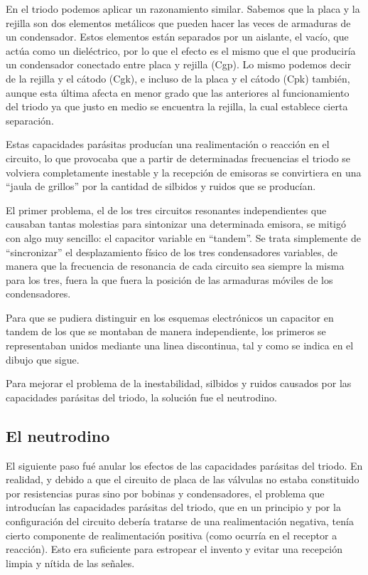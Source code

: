 \documentclass[letterpaper,11pt,spanish]{sphinxmanual}
\let\sphinxpxdimen\pdfpxdimen\else\newdimen\sphinxpxdimen
\begin{document}
En el triodo podemos aplicar un razonamiento similar. Sabemos que la placa y la rejilla son dos elementos metálicos que pueden hacer las veces de armaduras de un condensador. Estos elementos están separados por un aislante, el vacío, que actúa como un dieléctrico, por lo que el efecto es el mismo que el que produciría un condensador conectado entre placa y rejilla (Cgp). Lo mismo podemos decir de la rejilla y el cátodo (Cgk), e incluso de la placa y el cátodo (Cpk) también, aunque esta última
afecta en menor grado que las anteriores al funcionamiento del triodo ya que justo en medio se encuentra la rejilla, la cual establece cierta separación.

Estas capacidades parásitas producían una realimentación o reacción en el circuito, lo que provocaba que a partir de determinadas frecuencias el triodo se volviera completamente inestable y la recepción de emisoras se convirtiera en una “jaula de grillos” por la cantidad de silbidos y ruidos que se producían.

El primer problema, el de los tres circuitos resonantes independientes que causaban tantas molestias para sintonizar una determinada emisora, se mitigó con algo muy sencillo: el capacitor variable en “tandem”. Se trata simplemente de “sincronizar” el desplazamiento físico de los tres condensadores variables, de manera que la frecuencia de resonancia de cada circuito sea siempre la misma para los tres, fuera la que fuera la posición de las armaduras móviles de los condensadores.

Para que se pudiera distinguir en los esquemas electrónicos un capacitor en tandem de los que se montaban de manera independiente, los primeros se representaban unidos mediante una linea discontinua, tal y como se indica en el dibujo que sigue.

\sphinxincludegraphics[width=588\sphinxpxdimen,height=213\sphinxpxdimen]{{receprfs2low}.png}

Para mejorar el problema de la inestabilidad, silbidos y ruidos causados por las capacidades parásitas del triodo, la solución fue el neutrodino.


\subsection{El neutrodino}
\label{\detokenize{introduccion/sistemas:El-neutrodino}}
El siguiente paso fué anular los efectos de las capacidades parásitas del triodo. En realidad, y debido a que el circuito de placa de las válvulas no estaba constituido por resistencias puras sino por bobinas y condensadores, el problema que introducían las capacidades parásitas del triodo, que en un principio y por la configuración del circuito debería tratarse de una realimentación negativa, tenía cierto componente de realimentación positiva (como ocurría en el receptor a reacción). Esto era
suficiente para estropear el invento y evitar una recepción limpia y nítida de las señales.
\end{document}
